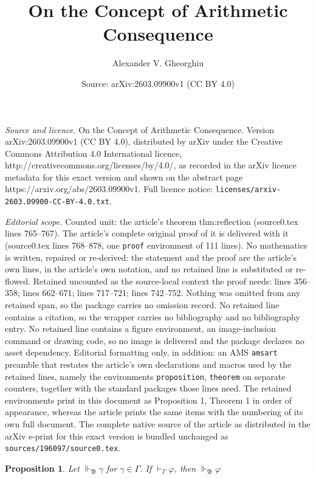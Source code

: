 \documentclass[10pt,a4paper]{amsart}
\title{On the Concept of Arithmetic Consequence}
\author{Alexander V. Gheorghiu}
\date{Source: arXiv:2603.09900v1 (CC BY 4.0)}
\newtheorem{proposition}{Proposition}
\newcommand{\base}[1]{\mathfrak{#1}}
\renewcommand{\phi}{\varphi}
\newcommand{\supp}{\Vdash}
\begin{document}
\maketitle

\noindent\emph{Source and licence.} On the Concept of Arithmetic Consequence. Version arXiv:2603.09900v1 (CC BY 4.0), distributed by arXiv under the Creative Commons Attribution 4.0 International licence, http://creativecommons.org/licenses/by/4.0/, as recorded in the arXiv licence metadata for this exact version and shown on the abstract page https://arxiv.org/abs/2603.09900v1. Full licence notice: \texttt{licenses/arxiv-2603.09900-CC-BY-4.0.txt}.\par\smallskip

\noindent\textit{Editorial scope.} Counted unit: the article's theorem thm:reflection (source0.tex lines 765--767). The article's complete original proof of it is delivered with it (source0.tex lines 768--878, one \texttt{proof} environment of 111 lines). No mathematics is written, repaired or re-derived: the statement and the proof are the article's own lines, in the article's own notation, and no retained line is substituted or re-flowed.  Retained uncounted as the source-local context the proof needs: lines 356--358; lines 662--671; lines 717--721; lines 742--752.  Nothing was omitted from any retained span, so the package carries no omission record.  No retained line contains a citation, so the wrapper carries no bibliography and no bibliography entry.  No retained line contains a figure environment, an image-inclusion command or drawing code, so no image is delivered and the package declares no asset dependency.  Editorial formatting only, in addition: an AMS \texttt{amsart} preamble that restates the article's own declarations and macros used by the retained lines, namely the environments \texttt{proposition}, \texttt{theorem} on separate counters, together with the standard packages those lines need.  The retained environments print in this document as Proposition 1, Theorem 1 in order of appearance, whereas the article prints the same items with the numbering of its own full document.  The complete native source of the article as distributed in the arXiv e-print for this exact version is bundled unchanged as \texttt{sources/196097/source0.tex}.
\begin{proposition} \label{prop:local-soundness}
Let $\supp_{\base{B}} \gamma$ for $\gamma \in \Gamma$. If $\vdash_{\Gamma} \phi$, then $\supp_{\base{B}} \phi$
\end{proposition}
\end{document}
